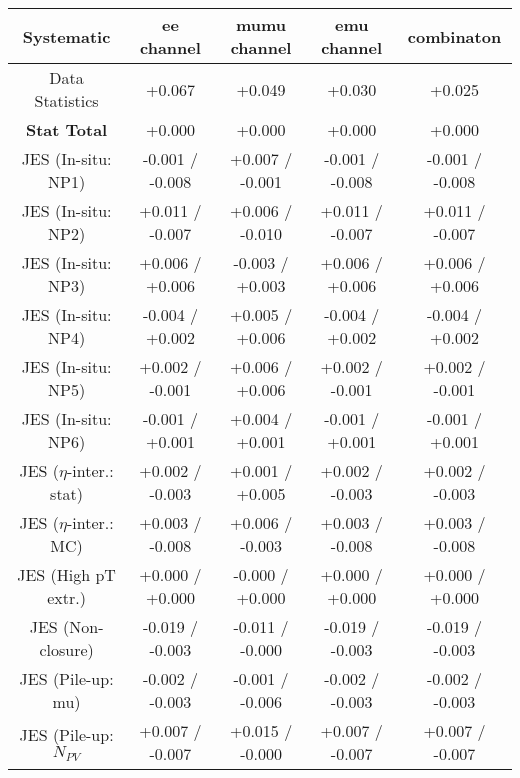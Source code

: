 \begin{table}[htbp]
\scriptsize
  \begin{center} 
  \begin{tabular}{|c|c|c|c|c|}
  \hline
Systematic                            &  ee channel&  mumu channel&  emu channel&  combinaton\\
  \hline
Data Statistics                       &+0.067              & +0.049              & +0.030              & +0.025             \\
\hline
\textbf{Stat Total}                   &+0.000              & +0.000              & +0.000              & +0.000             \\
\hline
JES (In-situ: NP1)                    &-0.001   / -0.008   & +0.007   / -0.001   & -0.001   / -0.008   & -0.001   / -0.008  \\
JES (In-situ: NP2)                    &+0.011   / -0.007   & +0.006   / -0.010   & +0.011   / -0.007   & +0.011   / -0.007  \\
JES (In-situ: NP3)                    &+0.006   / +0.006   & -0.003   / +0.003   & +0.006   / +0.006   & +0.006   / +0.006  \\
JES (In-situ: NP4)                    &-0.004   / +0.002   & +0.005   / +0.006   & -0.004   / +0.002   & -0.004   / +0.002  \\
JES (In-situ: NP5)                    &+0.002   / -0.001   & +0.006   / +0.006   & +0.002   / -0.001   & +0.002   / -0.001  \\
JES (In-situ: NP6)                    &-0.001   / +0.001   & +0.004   / +0.001   & -0.001   / +0.001   & -0.001   / +0.001  \\
JES ($\eta$-inter.: stat)               &+0.002   / -0.003   & +0.001   / +0.005   & +0.002   / -0.003   & +0.002   / -0.003  \\
JES ($\eta$-inter.: MC)                 &+0.003   / -0.008   & +0.006   / -0.003   & +0.003   / -0.008   & +0.003   / -0.008  \\
JES (High pT extr.)                  &+0.000   / +0.000   & -0.000   / +0.000   & +0.000   / +0.000   & +0.000   / +0.000  \\
JES (Non-closure)                     &-0.019   / -0.003   & -0.011   / -0.000   & -0.019   / -0.003   & -0.019   / -0.003  \\
JES (Pile-up: mu)                     &-0.002   / -0.003   & -0.001   / -0.006   & -0.002   / -0.003   & -0.002   / -0.003  \\
JES (Pile-up: $N_{PV}$                  &+0.007   / -0.007   & +0.015   / -0.000   & +0.007   / -0.007   & +0.007   / -0.007  \\

\end{tabular}
\end{center}
\end{table}
